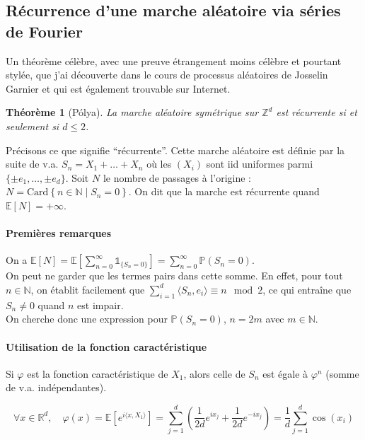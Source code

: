 \documentclass[a4paper, 11pt]{article}
\def\Z{\mathbb{Z}}
\def\N{\mathbb{N}}
\def\P{\mathbb{P}}
\def\R{\mathbb{R}}
\def\E{\mathbb{E}}
\def\Indic{\mathbb{1}}
\newtheorem*{theorem}{Théorème}
\begin{document}
\newpage


\subsection{Récurrence d'une marche aléatoire via séries de Fourier}

Un théorème célèbre, avec une preuve étrangement moins célèbre et pourtant
stylée, que j'ai découverte dans le cours de processus aléatoires de Josselin
Garnier et qui est également trouvable sur Internet.

\begin{theorem}[Pólya]
  La marche aléatoire symétrique sur $\Z^d$ est \emph{récurrente} si et
  seulement si $d \leq 2$.
\end{theorem}

Précisons ce que signifie \enquote{récurrente}. Cette marche aléatoire est
définie par la suite de v.a. $S_n = X_1 + \ldots + X_n$ où les $(X_i)$ sont iid
uniformes parmi $\{\pm e_1, \ldots, \pm e_d\}$. Soit $N$ le nombre de passages à
l'origine : $N = \mathrm{Card}\left\{n \in \N \mid S_n = 0\right\}$. On dit que
la marche est récurrente quand $\E[N] = +\infty$.


\paragraph{Premières remarques} On a $\displaystyle \E[N] = \E\left[
  \sum_{n=0}^\infty \Indic_{\{S_n = 0\}} \right] =
\sum_{n=0}^\infty \P(S_n = 0)$.\\
On peut ne garder que les termes pairs dans cette somme. En effet, pour tout $n
\in \N$, on établit facilement que $\sum_{i=1}^d \langle S_n, e_i \rangle \equiv
n \mod 2$, ce qui entraîne que $S_n \neq 0$ quand $n$ est impair.\\
On cherche donc une expression pour $\P(S_n = 0)$, $n = 2m$ avec $m \in \N$.

\paragraph{Utilisation de la fonction caractéristique}

Si $\varphi$ est la fonction caractéristique de $X_1$, alors celle de $S_n$
est égale à $\varphi^n$ (somme de v.a. indépendantes).

\[ \forall x \in \R^d,\quad \varphi(x) = \E\left[ e^{i \langle x, X_1 \rangle}
  \right]
  = \sum_{j=1}^d \left( \frac{1}{2d}e^{ix_j} + \frac{1}{2d}e^{-ix_j}\right)
  = \frac{1}{d} \sum_{j=1}^d \cos(x_i) \]
\end{document}
